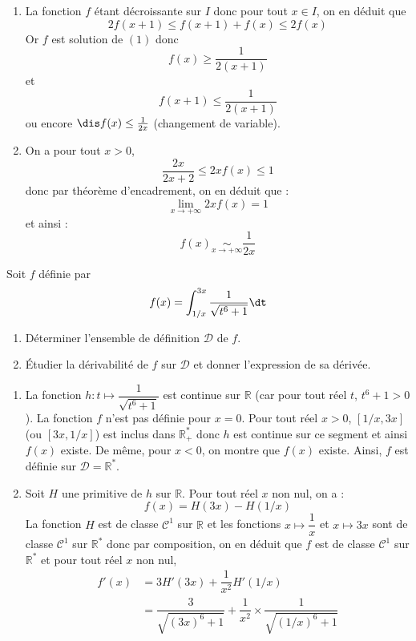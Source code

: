 \documentclass[a4paper,10pt]{report}
\begin{document}
\begin{enumerate}
	\item La fonction $f$ \'etant d\'ecroissante sur $I$ donc pour tout $x \in I$, on en d\'eduit que 
	$$2f(x+1) \le f(x+1)+f(x) \le 2f(x)$$
Or $f$ est solution de $(1)$ donc 
$$f(x)\ge \frac1{2(x+1)}$$
 et $$f(x+1) \le \frac1{2(x+1)}$$
ou encore $\dis f(x) \le \frac1{2x}$ (changement de variable).

	\item On a pour tout $x>0$,
$$\frac{2x}{2x+2} \le 2xf(x) \le 1$$ 
donc par théorème d'encadrement, on en déduit que :
$$\lim\limits_{x\to+\infty}2xf(x)=1$$
et ainsi :
$$ f(x) \underset{x\to+\infty}\sim \frac1{2x}$$
	\end{enumerate}

\begin{Exa} Soit $f$ définie par 
$$f(x) = \int_{1/x}^{3x}\frac{1}{\sqrt{t^6+1}}\dt$$ 
\begin{enumerate}
\item Déterminer l'ensemble de définition $\mathcal{D}$ de $f$.
\item Étudier la dérivabilité de $f$ sur $\mathcal{D}$ et donner l'expression de sa dérivée.
\end{enumerate}
\end{Exa} 

\corr 

\begin{enumerate}
\item La fonction $h : t \mapsto \dfrac{1}{\sqrt{t^6+1}}$ est continue sur $\mathbb{R}$ (car pour tout réel $t$, $t^6+1>0$). La fonction $f$ n'est pas définie pour $x=0$. Pour tout réel $x>0$, $[1/x,3x]$ (ou $[3x, 1/x]$) est inclus dans $\mathbb{R}_+^*$ donc $h$ est continue sur ce segment et ainsi $f(x)$ existe.  De même, pour $x<0$, on montre que $f(x)$ existe. Ainsi, $f$ est définie sur $\mathcal{D} = \mathbb{R}^*$.
\item Soit $H$ une primitive de $h$ sur $\mathbb{R}$. Pour tout réel $x$ non nul, on a :
$$ f(x) = H(3x)-H(1/x)$$
La fonction $H$ est de classe $\mathcal{C}^1$ sur $\mathbb{R}$ et les fonctions $x \mapsto \dfrac{1}{x}$ et $x \mapsto 3x$ sont de classe $\mathcal{C}^1$ sur $\mathbb{R}^*$ donc par composition, on en déduit que $f$ est de classe $\mathcal{C}^1$ sur $\mathbb{R}^*$ et pour tout réel $x$ non nul,
\begin{align*}
f'(x) & = 3 H'(3x)  + \dfrac{1}{x^2} H'(1/x) \\
& = \dfrac{3}{\sqrt{(3x)^6+1}} + \dfrac{1}{x^2} \times \dfrac{1}{\sqrt{(1/x)^6+1}} 
\end{align*}
\end{enumerate}
\end{document}
